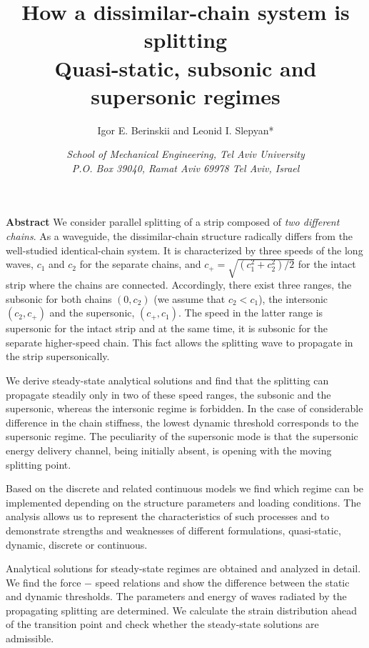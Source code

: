 \documentclass[12pt]{article}
\begin{document}
{\large
\title{How a dissimilar-chain system is splitting \\ Quasi-static, subsonic and supersonic regimes }

\author{Igor E. Berinskii and Leonid I. Slepyan*}
\date{\small{{\em School of Mechanical Engineering, Tel Aviv University\\
P.O. Box 39040, Ramat Aviv 69978 Tel Aviv, Israel}}\\
 }}

\maketitle

\vspace{0mm}\noindent
{\bf Abstract}
\noindent
We consider parallel splitting of a strip composed of {\em two different chains}. As a waveguide, the dissimilar-chain structure radically differs from the well-studied identical-chain system. It is characterized by three speeds of the long waves, $c_1$ and $c_2$  for the separate chains, and $c_+=\sqrt{(c_1^2+c_2^2)/2}$ for the intact strip where the chains are connected. Accordingly, there exist three ranges, the subsonic for both chains $(0, c_2)$ (we assume that $c_2<c_1$), the  intersonic $(c_2, c_+)$  and the supersonic, $(c_+,c_1)$. The speed in the latter range is supersonic for the intact strip and at the same time, it is subsonic for the separate higher-speed chain. This fact allows the splitting wave to propagate in the strip supersonically.

We derive steady-state analytical solutions and find that the splitting can propagate steadily only in two of these speed ranges, the subsonic and the supersonic, whereas the intersonic regime is forbidden. In the case of considerable difference in the chain stiffness, the lowest dynamic threshold corresponds to the supersonic regime. The peculiarity of the supersonic mode is that the supersonic energy delivery channel, being initially absent, is opening with the moving splitting point.

Based on the discrete and related continuous models we find which regime can be implemented depending on the structure parameters and loading conditions. The analysis allows us to represent the characteristics of such processes and to demonstrate strengths and weaknesses of different formulations, quasi-static, dynamic, discrete or continuous.

Analytical solutions for steady-state regimes are obtained and analyzed in detail. We find the force $-$ speed relations and show the difference between the static and dynamic thresholds. The parameters and energy of waves radiated by the propagating splitting are determined. We calculate the strain distribution ahead of the transition point and check whether the steady-state solutions are admissible.
\end{document}

